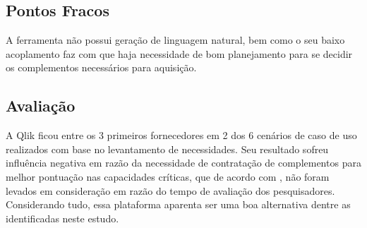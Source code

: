 \subsection*{Pontos Fracos}

A ferramenta não possui geração de linguagem natural, bem como o seu baixo acoplamento faz com que haja necessidade de bom planejamento para se decidir os complementos necessários para aquisição.

\subsection*{Avaliação}

A Qlik ficou entre os 3 primeiros fornecedores em 2 dos 6 cenários de caso de uso realizados com base no levantamento de necessidades. Seu resultado sofreu influência negativa em razão da necessidade de contratação de complementos para melhor pontuação nas capacidades críticas, que de acordo com \cite{gartner:criticalcapabilities}, não foram levados em consideração em razão do tempo de avaliação dos pesquisadores. Considerando tudo, essa plataforma aparenta ser uma boa alternativa dentre as identificadas neste estudo. 